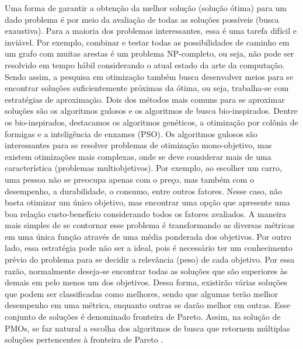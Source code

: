 Uma forma de garantir a obtenção da melhor solução (solução ótima) para um dado problema é por meio da avaliação de todas as soluções possíveis (busca exaustiva). Para a maioria dos problemas interessantes, essa é uma tarefa difícil e inviável. Por exemplo, combinar e testar todas as possibilidades de caminho em um grafo com muitas arestas é um problema NP-completo, ou seja, não pode ser resolvido em tempo hábil considerando o atual estado da arte da computação. Sendo assim, a pesquisa em otimização também busca desenvolver meios para se encontrar soluções suficientemente próximas da ótima, ou seja, trabalha-se com estratégias de aproximação. Dois dos métodos mais comuns para se aproximar soluções são os algoritmos gulosos e os algoritmos de busca bio-inspirados. Dentre os bio-inspirados, destacamos os algoritmos genéticos, a otimização por colônia de formigas e a inteligência de enxames (PSO). Os algoritmos gulosos são interessantes para se resolver problemas de otimização mono-objetivo, mas existem otimizações mais complexas, onde se deve considerar mais de uma característica (problemas multiobjetivos). Por exemplo, ao escolher um carro, uma pessoa não se preocupa apenas com o preço, mas também com o desempenho, a durabilidade, o consumo, entre outros fatores. Nesse caso, não basta otimizar um único objetivo, mas encontrar uma opção que apresente uma boa relação custo-benefício considerando todos os fatores avaliados. A maneira mais simples de se contornar esse problema é transformando as diversas métricas em uma única função através de uma média ponderada dos objetivos. Por outro lado, essa estratégia pode não ser a ideal, pois é necessário ter um conhecimento prévio do problema para se decidir a relevância (peso) de cada objetivo. Por essa razão, normalmente deseja-se encontrar todas as soluções que são superiores às demais em pelo menos um dos objetivos. Dessa forma, existirão várias soluções que podem ser classificadas como
melhores, sendo que algumas terão melhor desempenho em uma métrica, enquanto outras se darão melhor em outras.  Esse conjunto de soluções é denominado fronteira de Pareto. Assim, na solução de \acp{PMO}, se faz natural a escolha dos algoritmos de busca que retornem múltiplas soluções pertencentes à fronteira de Pareto \cite{Srinivas1994}.

